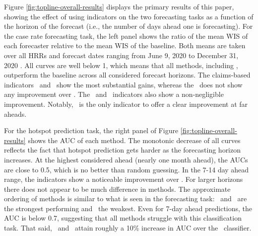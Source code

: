 \documentclass[9pt,twocolumn,twoside,lineno]{pnas-new}
\begin{document}
Figure \ref{fig:topline-overall-results} displays the primary results
of this paper, showing the effect of using indicators on the two
forecasting tasks as a function of the horizon of the forecast (i.e.,
the number of days ahead one is forecasting). For the case rate forecasting
task, the left panel shows the ratio of the mean
WIS 
of each forecaster relative to the mean WIS of the
baseline.   Both means are taken over all HRRs and forecast
dates ranging from June 9, 2020 to December 31, 2020 .
All curves are well below 1, which means that all methods, including \ar, outperform the baseline across all
considered forecast horizons. The claims-based
indicators \dv~and \chngcov~show the most substantial gains, whereas
the \chngcli~does not show any improvement over \ar.  The \fb~and
\gs~indicators also show a non-negligible improvement.  Notably,
\fb~is the only indicator to offer a clear improvement at far aheads.

For the hotspot prediction task, the right panel of Figure
\ref{fig:topline-overall-results} shows the AUC of each method.
The monotonic decrease of all curves reflects the fact that hotspot
prediction gets harder as the forecasting horizon increases. At the
highest considered ahead (nearly one month ahead), the AUCs are close
  to 0.5, which is no better than random guessing.
In the 7-14 day ahead range, the indicators show a noticeable
  improvement over \ar.  For larger horizons there does not
  appear to be much difference in methods.
The approximate ordering of methods is similar to what is seen
  in the forecasting task: \chngcov~and \dv~are the strongest
  performing and \ar~the weakest.
Even for 7-day ahead predictions, the AUC is below 0.7,
  suggesting that all methods struggle with this classification
  task. 
  That said, \dv~and \chngcov~attain roughly a 10\% increase in AUC
  over the \ar~classifier.
  
\end{document}
